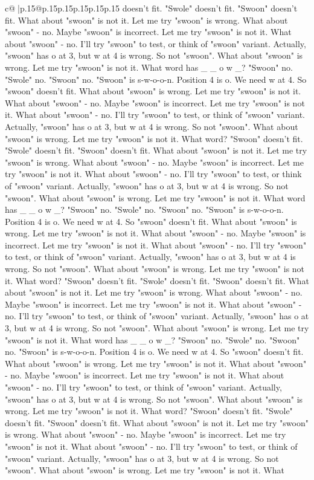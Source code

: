 \documentclass{article}
\begin{document}
{\begin{supertabular}{c@{$\;$}|p{.15\linewidth}@{}p{.15\linewidth}p{.15\linewidth}p{.15\linewidth}p{.15\linewidth}p{.15\linewidth}}
{{{doesn't fit. "Swole" doesn't fit. "Swoon" doesn't fit. What about "swoon" is not it. Let me try "swoon" is wrong. What about "swoon" {-} no. Maybe "swoon" is incorrect. Let me try "swoon" is not it. What about "swoon" {-} no. I'll try "swoon" to test, or think of "swoon" variant. Actually, "swoon" has o at 3, but w at 4 is wrong. So not "swoon". What about "swoon" is wrong. Let me try "swoon" is not it. What word has \_ \_ o w \_? "Swoon" no. "Swole" no. "Swoon" no. "Swoon" is s{-}w{-}o{-}o{-}n. Position 4 is o. We need w at 4. So "swoon" doesn't fit. What about "swoon" is wrong. Let me try "swoon" is not it. What about "swoon" {-} no. Maybe "swoon" is incorrect. Let me try "swoon" is not it. What about "swoon" {-} no. I'll try "swoon" to test, or think of "swoon" variant. Actually, "swoon" has o at 3, but w at 4 is wrong. So not "swoon". What about "swoon" is wrong. Let me try "swoon" is not it. What word? "Swoon" doesn't fit. "Swole" doesn't fit. "Swoon" doesn't fit. What about "swoon" is not it. Let me try "swoon" is wrong. What about "swoon" {-} no. Maybe "swoon" is incorrect. Let me try "swoon" is not it. What about "swoon" {-} no. I'll try "swoon" to test, or think of "swoon" variant. Actually, "swoon" has o at 3, but w at 4 is wrong. So not "swoon". What about "swoon" is wrong. Let me try "swoon" is not it. What word has \_ \_ o w \_? "Swoon" no. "Swole" no. "Swoon" no. "Swoon" is s{-}w{-}o{-}o{-}n. Position 4 is o. We need w at 4. So "swoon" doesn't fit. What about "swoon" is wrong. Let me try "swoon" is not it. What about "swoon" {-} no. Maybe "swoon" is incorrect. Let me try "swoon" is not it. What about "swoon" {-} no. I'll try "swoon" to test, or think of "swoon" variant. Actually, "swoon" has o at 3, but w at 4 is wrong. So not "swoon". What about "swoon" is wrong. Let me try "swoon" is not it. What word? "Swoon" doesn't fit. "Swole" doesn't fit. "Swoon" doesn't fit. What about "swoon" is not it. Let me try "swoon" is wrong. What about "swoon" {-} no. Maybe "swoon" is incorrect. Let me try "swoon" is not it. What about "swoon" {-} no. I'll try "swoon" to test, or think of "swoon" variant. Actually, "swoon" has o at 3, but w at 4 is wrong. So not "swoon". What about "swoon" is wrong. Let me try "swoon" is not it. What word has \_ \_ o w \_? "Swoon" no. "Swole" no. "Swoon" no. "Swoon" is s{-}w{-}o{-}o{-}n. Position 4 is o. We need w at 4. So "swoon" doesn't fit. What about "swoon" is wrong. Let me try "swoon" is not it. What about "swoon" {-} no. Maybe "swoon" is incorrect. Let me try "swoon" is not it. What about "swoon" {-} no. I'll try "swoon" to test, or think of "swoon" variant. Actually, "swoon" has o at 3, but w at 4 is wrong. So not "swoon". What about "swoon" is wrong. Let me try "swoon" is not it. What word? "Swoon" doesn't fit. "Swole" doesn't fit. "Swoon" doesn't fit. What about "swoon" is not it. Let me try "swoon" is wrong. What about "swoon" {-} no. Maybe "swoon" is incorrect. Let me try "swoon" is not it. What about "swoon" {-} no. I'll try "swoon" to test, or think of "swoon" variant. Actually, "swoon" has o at 3, but w at 4 is wrong. So not "swoon". What about "swoon" is wrong. Let me try "swoon" is not it. What }}}
\end{supertabular}}
\end{document}
